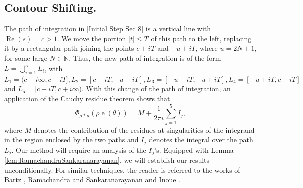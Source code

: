 \documentclass[11pt]{amsart}
\numberwithin{equation}{section}
\numberwithin{figure}{section}
\theoremstyle{definition}
\newcommand{\e}{\operatorname{e}}
\begin{document}
\subsection*{Contour Shifting.} The path of integration in \ref{Initial Step Sec 8} is a vertical line with $\operatorname{Re}(s)=c >1$. We move the portion $|t| \leqslant T$ of this path to the left, replacing it by a rectangular path joining the points $c \pm i T$ and $-u \pm i T$, where $u=2N+1$, for some large $N \in \mathbb{N}$. Thus, the new path of integration is of the form $L=\bigcup_{i=1}^5 L_i$, with $L_1=(c-i \infty, c-i T],  L_2=[c-i T, -u-i T],  L_3=[-u-i T, -u+i T],  L_4=[-u+i T, c+i T]$ and $ L_5=[c+i T, c+i \infty)$.
With this change of the path of integration, an application of the Cauchy residue theorem shows that
\[
\Phi_{\mu * \mu}(\rho \e(\theta)) = M+\frac{1}{2 \pi i} \sum_{j=1}^5 I_j,
\]
where $M$ denotes the contribution of the residues at singularities of the integrand in the region enclosed by the two paths and $I_j$ denotes the integral over the path $L_j$. Our method will require an analysis of the $I_j$'s. Equipped with Lemma \ref{lem:RamachandraSankaranarayanan}, we will establish our results unconditionally. For similar techniques, the reader is referred to the works of Bartz \cite{Bartz}, Ramachandra and Sankaranarayanan \cite{RamachandraSankaranarayanan} and Inoue \cite{Inoue}.
\end{document}
